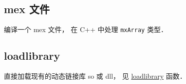
\begin{issues}
\issueDraft
\end{issues}

\subsection{mex 文件}
编译一个 mex 文件， 在 C++ 中处理 \verb|mxArray| 类型． %

\subsection{loadlibrary}
直接加载现有的动态链接库 so 或 dll， 见 \href{https://www.mathworks.com/help/matlab/ref/loadlibrary.html}{loadlibrary} 函数．
